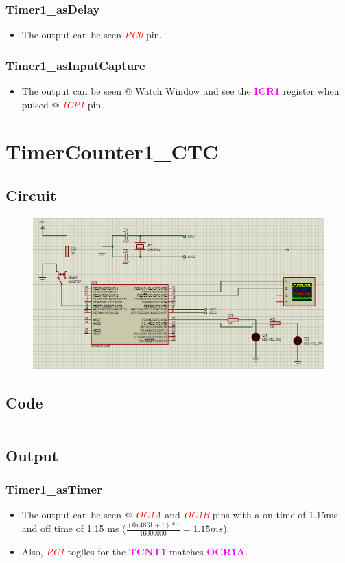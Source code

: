 \documentclass[oneside]{book}
\newcommand{\pinFormat}[1]{\emph{\textcolor{red}{#1}}}
\newcommand{\regFormat}[1]{\textbf{\textcolor{magenta}{#1}}}
\begin{document}
\subsubsection{Timer1\_asDelay}
\begin{itemize}
    \item The output can be seen \pinFormat{PC0} pin.
\end{itemize}
\subsubsection{Timer1\_asInputCapture}
\begin{itemize}
    \item The output can be seen @ Watch Window and see the \regFormat{ICR1} register when pulsed @ \pinFormat{ICP1} pin.
\end{itemize}

\section{TimerCounter1\_CTC}
\subsection{Circuit}
\begin{figure}[H]
    \centering
    \includegraphics[height=0.2\textheight]{TimerCounter1_CTC.png}
\end{figure}
\subsection{Code}
\inputminted[breaklines, bgcolor=black]{c}{./programFiles/TimerCounter1_CTC.c}
\subsection{Output}
\subsubsection{Timer1\_asTimer}
\begin{itemize}
    \item The output can be seen @ \pinFormat{OC1A} and \pinFormat{OC1B} pins with a on time of 1.15ms and off time of 1.15 ms ($\frac{(0x4861+1) * 1}{16000000} = 1.15 ms$).
    \item Also, \pinFormat{PC1} toglles for the \regFormat{TCNT1} matches \regFormat{OCR1A}.
\end{itemize}
\end{document}
